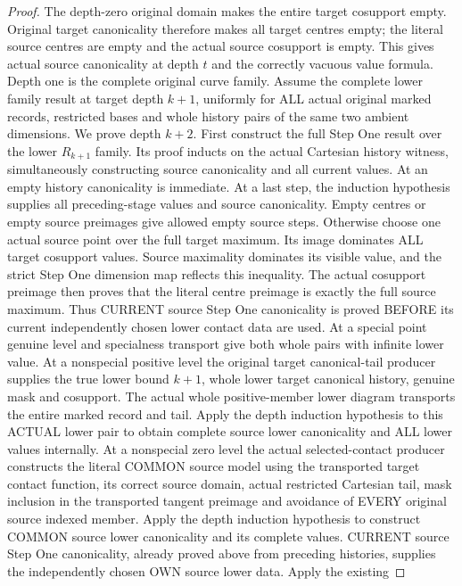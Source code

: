\begin{proof}
The depth-zero original domain makes the entire target cosupport empty.
Original target canonicality therefore makes all target centres empty;
the literal source centres are empty and the actual source cosupport is
empty. This gives actual source canonicality at depth $t$ and the correctly
vacuous value formula. Depth one is the complete original curve family.
Assume the complete lower family result at target depth $k+1$, uniformly
for ALL actual original marked records, restricted bases and whole history
pairs of the same two ambient dimensions. We prove depth $k+2$.
First construct the full Step One result over the lower $R_{k+1}$ family.
Its proof inducts on the actual Cartesian history witness, simultaneously
constructing source canonicality and all current values. At an empty
history canonicality is immediate. At a last step, the induction hypothesis
supplies all preceding-stage values and source canonicality. Empty centres
or empty source preimages give allowed empty source steps. Otherwise choose
one actual source point over the full target maximum. Its image dominates
ALL target cosupport values. Source maximality dominates its visible value,
and the strict Step One dimension map reflects this inequality. The actual
cosupport preimage then proves that the literal centre preimage is exactly
the full source maximum. Thus CURRENT source Step One canonicality is proved
BEFORE its current independently chosen lower contact data are used.
At a special point genuine level and specialness transport give both whole
pairs with infinite lower value. At a nonspecial positive level the original
target canonical-tail producer supplies the true lower bound $k+1$, whole
lower target canonical history, genuine mask and cosupport. The actual whole
positive-member lower diagram transports the entire marked record and tail.
Apply the depth induction hypothesis to this ACTUAL lower pair to obtain
complete source lower canonicality and ALL lower values internally.
At a nonspecial zero level the actual selected-contact producer constructs
the literal COMMON source model using the transported target contact
function, its correct source domain, actual restricted Cartesian tail,
mask inclusion in the transported tangent preimage and avoidance of EVERY
original source indexed member. Apply the depth induction hypothesis to
construct COMMON source lower canonicality and its complete values. CURRENT
source Step One canonicality, already proved above from preceding histories,
supplies the independently chosen OWN source lower data. Apply the existing

\end{proof}
